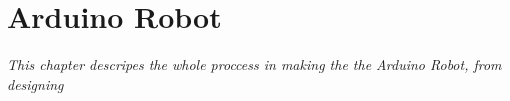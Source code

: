 \chapter{Arduino Robot}
\textit{This chapter descripes the whole proccess in making the the Arduino Robot, from designing}%




